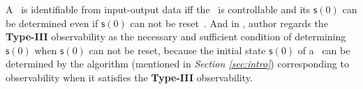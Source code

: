 
A \BCN\ is identifiable from input-output data iff the \BCN\ is controllable and its $\mathsf{s}(0)$ can be determined even if $\mathsf{s}(0)$ can not be reset~\cite{Cheng2011Identification}. And in \cite{Cheng2011Identification}, author regards the {\bf Type-III} observability as the necessary and sufficient condition of determining $\mathsf{s}(0)$ when $\mathsf{s}(0)$ can not be reset, because the initial state $\mathsf{s}(0)$ of a \BCN\ can be determined by the algorithm (mentioned in {\em Section \ref{sec:intro}}) corresponding to observability when it satisfies the {\bf Type-III} observability.


   

